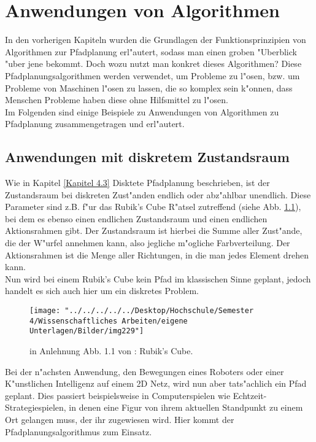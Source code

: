 \chapter{Anwendungen von Algorithmen}
In den vorherigen Kapiteln wurden die Grundlagen der Funktionsprinzipien von Algorithmen zur Pfadplanung erl"autert, sodass man einen groben "Uberblick "uber jene bekommt. Doch wozu nutzt man konkret dieses Algorithmen? Diese Pfadplanungsalgorithmen werden verwendet, um Probleme zu l"osen, bzw. um Probleme von Maschinen l"osen zu lassen, die so komplex sein k"onnen, dass Menschen Probleme haben diese ohne Hilfsmittel zu l"osen.\\
Im Folgenden sind einige Beispiele zu Anwendungen von Algorithmen zu Pfadplanung zusammengetragen und erl"autert.

\section{Anwendungen mit diskretem Zustandsraum}
Wie in Kapitel \ref{Kapitel 4.3} Disktete Pfadplanung beschrieben, ist der Zustandsraum bei diskreten Zust"anden endlich oder abz"ahlbar unendlich. Diese Parameter sind z.B. f"ur das Rubik's Cube R"atsel zutreffend (siehe Abb. \ref{Abb. 5.1}), bei dem es ebenso einen endlichen Zustandsraum und einen endlichen Aktionsrahmen gibt. Der Zustandsraum ist hierbei die Summe aller Zust"ande, die der W"urfel annehmen kann, also jegliche m"ogliche Farbverteilung. Der Aktionsrahmen ist die Menge aller Richtungen, in die man jedes Element drehen kann.\\ Nun wird bei einem Rubik's Cube kein Pfad im klassischen Sinne geplant, jedoch handelt es sich auch hier um ein diskretes Problem.\\
\begin{figure}
	\centering
	\texttt{[image: "../../../../../Desktop/Hochschule/Semester 4/Wissenschaftliches Arbeiten/eigene Unterlagen/Bilder/img229"]}
	\caption{in Anlehnung Abb. 1.1 von \cite[~S. 5]{Lav06}: Rubik's Cube.}
	\label{Abb. 5.1}
\end{figure}

Bei der n"achsten Anwendung, den Bewegungen eines Roboters oder einer K"unstlichen Intelligenz auf einem 2D Netz, wird nun aber tats"achlich ein Pfad geplant. Dies passiert beispielsweise in Computerspielen wie Echtzeit-Strategiespielen, in denen eine Figur von ihrem aktuellen Standpunkt zu einem Ort gelangen muss, der ihr zugewiesen wird. Hier kommt der Pfadplanungsalgorithmus zum Einsatz.\\
